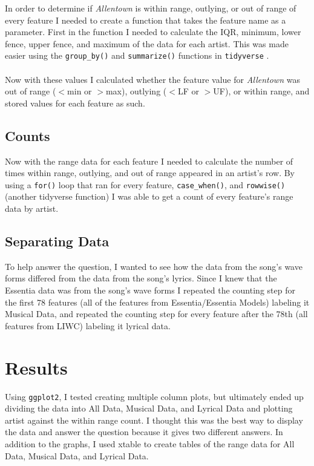 \documentclass{article}\usepackage[]{graphicx}\usepackage[]{xcolor}
\begin{document}
\begin{multicols}{2}
In order to determine if \emph{Allentown} is within range, outlying, or out of range of every feature I needed to create a function that takes the feature name as a parameter. First in the function I needed to calculate the IQR, minimum, lower fence, upper fence, and maximum of the data for each artist. This was made easier using the \texttt{group\_by()} and \texttt{summarize()} functions in \texttt{tidyverse} \citep{tidyverse}.
\\ \\
Now with these values I calculated whether the feature value for \emph{Allentown} was out of range ($<$min or $>$max), outlying ($<$LF or $>$UF), or within range, and stored values for each feature as such.

\columnbreak

\subsection{Counts}

Now with the range data for each feature I needed to calculate the number of times within range, outlying, and out of range appeared in an artist's row. By using a \texttt{for()} loop that ran for every feature, \texttt{case\_when()}, and \texttt{rowwise()} (another tidyverse function) I was able to get a count of every feature's range data by artist.

\subsection{Separating Data}

To help answer the question, I wanted to see how the data from the song's wave forms differed from the data from the song's lyrics. Since I knew that the Essentia data was from the song's wave forms I repeated the counting step for the first 78 features (all of the features from Essentia/Essentia Models) labeling it Musical Data, and repeated the counting step for every feature after the 78th (all features from LIWC) labeling it lyrical data.


\section{Results}

Using \texttt{ggplot2}, \citep{ggplot2} I tested creating multiple column plots, but ultimately ended up dividing the data into All Data, Musical Data, and Lyrical Data and plotting artist against the within range count. I thought this was the best way to display the data and answer the question because it gives two different answers. In addition to the graphs, I used xtable \citep{xtable} to create tables of the range data for All Data, Musical Data, and Lyrical Data.


\end{multicols}
\end{document}
